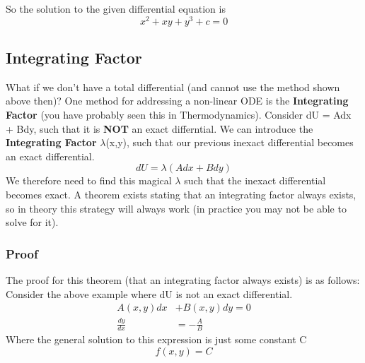 \documentclass{article}
\newcommand{\be}{\begin{equation}}
\newcommand{\ee}{\end{equation}}
\begin{document}
So the solution to the given differential equation is 
\be
x^2 + xy + y^3 + c = 0
\ee
\subsection*{Integrating Factor}
What if we don't have a total differential (and cannot use the method shown above then)?
One method for addressing a non-linear ODE is the \textbf{Integrating Factor} (you have probably seen this in Thermodynamics). 
Consider dU = Adx + Bdy, such that it is \textbf{NOT} an exact differntial.
We can introduce the \textbf{Integrating Factor} $\lambda$(x,y), such that our previous inexact differential becomes an exact differential. 
\be
dU = \lambda(Adx + Bdy)
\ee
We therefore need to find this magical $\lambda$ such that the inexact differential becomes exact.
A theorem exists stating that an integrating factor always exists, so in theory this strategy will always work (in practice you may not be able to solve for it). 

\subsubsection*{Proof}
The proof for this theorem (that an integrating factor always exists) is as follows:
Consider the above example where dU is not an exact differential. 
\be
\begin{split}
    A(x,y)dx &+ B(x,y)dy = 0 \\
    \frac{dy}{dx} &= -\frac{A}{B}
\end{split}
\ee
Where the general solution to this expression is just some constant C
\be
f(x,y) = C
\ee
\end{document}
